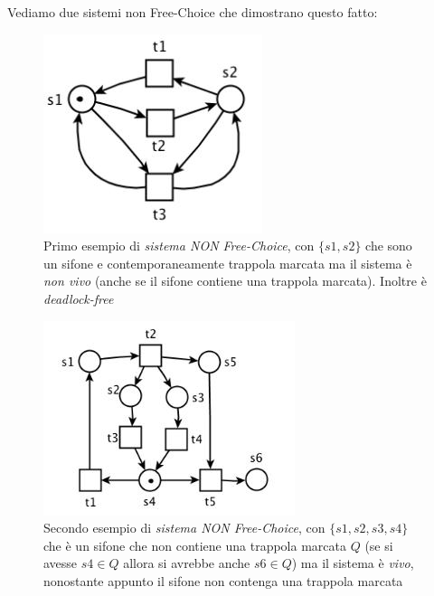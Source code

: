 \documentclass[a4paper,12pt, oneside]{book}
\begin{document}
\begin{esempio}
  Vediamo due sistemi non Free-Choice che dimostrano questo fatto:\\
  \begin{figure}[H]
    \centering
    \includegraphics[scale = 0.55]{img/fc3.jpg}
    \caption{Primo esempio di \emph{sistema NON Free-Choice}, con $\{s1,s2\}$
      che sono un sifone e contemporaneamente trappola marcata ma il sistema è
      \emph{non vivo} (anche se il sifone contiene una trappola
      marcata). Inoltre è \emph{deadlock-free}}
  \end{figure}
  \begin{figure}[H]
    \centering
    \includegraphics[scale = 0.6]{img/fc4.jpg}
    \caption{Secondo esempio di \emph{sistema NON Free-Choice}, con
      $\{s1,s2,s3,s4\}$ che è un sifone che non contiene una trappola marcata
      $Q$ (se si avesse $s4\in Q$ allora si avrebbe anche $s6\in Q$) ma il
      sistema è \emph{vivo}, nonostante appunto il sifone non contenga una
      trappola marcata} 
  \end{figure}
\end{esempio}
\end{document}
